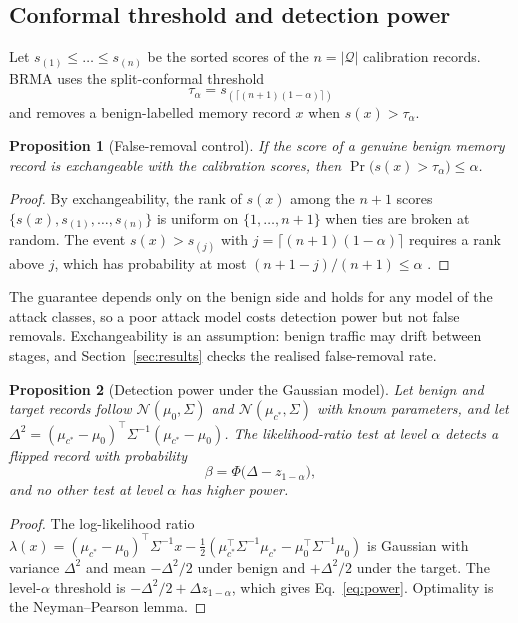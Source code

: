 \documentclass[pdflatex,sn-mathphys-num]{sn-jnl}
\theoremstyle{thmstyleone}
\newtheorem{proposition}{Proposition}
\theoremstyle{thmstylethree}
\begin{document}
\subsection{Conformal threshold and detection power}
Let $s_{(1)}\le\dots\le s_{(n)}$ be the sorted scores of the $n=|\mathcal{Q}|$ calibration records. BRMA uses the split-conformal threshold \cite{vovk,lei}
\begin{equation}
\tau_\alpha=s_{(\lceil (n+1)(1-\alpha)\rceil)}
\label{eq:tau}
\end{equation}
and removes a benign-labelled memory record $x$ when $s(x)>\tau_\alpha$.

\begin{proposition}[False-removal control]\label{prop:fdr}
If the score of a genuine benign memory record is exchangeable with the calibration scores, then $\Pr\big(s(x)>\tau_\alpha\big)\le\alpha$.
\end{proposition}
\begin{proof}
By exchangeability, the rank of $s(x)$ among the $n+1$ scores $\{s(x),s_{(1)},\dots,s_{(n)}\}$ is uniform on $\{1,\dots,n+1\}$ when ties are broken at random. The event $s(x)>s_{(j)}$ with $j=\lceil (n+1)(1-\alpha)\rceil$ requires a rank above $j$, which has probability at most $(n+1-j)/(n+1)\le\alpha$ \cite{bates}.
\end{proof}

The guarantee depends only on the benign side and holds for any model of the attack classes, so a poor attack model costs detection power but not false removals. Exchangeability is an assumption: benign traffic may drift between stages, and Section~\ref{sec:results} checks the realised false-removal rate.

\begin{proposition}[Detection power under the Gaussian model]\label{prop:power}
Let benign and target records follow $\mathcal{N}(\mu_0,\Sigma)$ and $\mathcal{N}(\mu_{c^\ast},\Sigma)$ with known parameters, and let $\Delta^2=(\mu_{c^\ast}-\mu_0)^{\top}\Sigma^{-1}(\mu_{c^\ast}-\mu_0)$. The likelihood-ratio test at level $\alpha$ detects a flipped record with probability
\begin{equation}
\beta=\Phi\big(\Delta-z_{1-\alpha}\big),
\label{eq:power}
\end{equation}
and no other test at level $\alpha$ has higher power.
\end{proposition}
\begin{proof}
The log-likelihood ratio $\lambda(x)=(\mu_{c^\ast}-\mu_0)^{\top}\Sigma^{-1}x-\tfrac12(\mu_{c^\ast}^{\top}\Sigma^{-1}\mu_{c^\ast}-\mu_0^{\top}\Sigma^{-1}\mu_0)$ is Gaussian with variance $\Delta^2$ and mean $-\Delta^2/2$ under benign and $+\Delta^2/2$ under the target. The level-$\alpha$ threshold is $-\Delta^2/2+\Delta z_{1-\alpha}$, which gives Eq.~\eqref{eq:power}. Optimality is the Neyman--Pearson lemma.
\end{proof}
\end{document}
